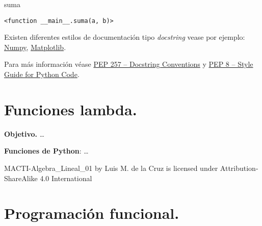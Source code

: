 \documentclass[
  letterpaper,
  DIV=11,
  numbers=noendperiod]{scrreprt}
\newenvironment{Shaded}{\begin{snugshade}}{\end{snugshade}}
\newcommand{\NormalTok}[1]{\textcolor[rgb]{0.00,0.23,0.31}{#1}}
\begin{document}
\begin{Shaded}
\begin{Highlighting}[]
\NormalTok{suma}
\end{Highlighting}
\end{Shaded}

\begin{verbatim}
<function __main__.suma(a, b)>
\end{verbatim}

Existen diferentes estilos de documentación tipo \emph{docstring} vease
por ejemplo:
\href{https://numpydoc.readthedocs.io/en/latest/format.html}{Numpy},
\href{https://matplotlib.org/devdocs/devel/document.html\#example-docstring}{Matplotlib}.

Para más información véase \href{https://peps.python.org/pep-0257/}{PEP
257 -- Docstring Conventions} y
\href{https://peps.python.org/pep-0008/}{PEP 8 -- Style Guide for Python
Code}.


\chapter{Funciones lambda.}\label{funciones-lambda.}

\textbf{Objetivo.} \ldots{}

\textbf{Funciones de Python}: \ldots{}

MACTI-Algebra\_Lineal\_01 by Luis M. de la Cruz is licensed under
Attribution-ShareAlike 4.0 International


\chapter{Programación funcional.}\label{programaciuxf3n-funcional.}
\end{document}
